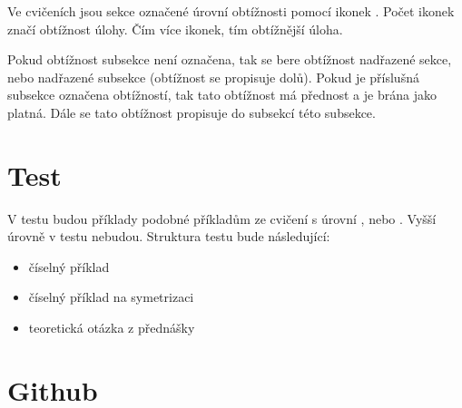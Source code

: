 \documentclass{article}
\begin{document}
Ve cvičeních jsou sekce označené úrovní obtížnosti pomocí ikonek \spicy. Počet ikonek značí obtížnost úlohy. Čím více ikonek, tím obtížnější úloha.

Pokud obtížnost subsekce není označena, tak se bere obtížnost nadřazené sekce, nebo nadřazené subsekce (obtížnost se propisuje dolů). Pokud je příslušná subsekce označena obtížností, tak tato obtížnost má přednost a je brána jako platná. Dále se tato obtížnost propisuje do subsekcí této subsekce.



\section{Test}

V testu budou příklady podobné příkladům ze cvičení s úrovní \spicy, nebo \spicy \spicy. Vyšší úrovně v testu nebudou. Struktura testu bude následující:

\begin{itemize}
    \item číselný příklad
    \item číselný příklad na symetrizaci
    \item teoretická otázka z přednášky
\end{itemize}



\section{Github}
\end{document}
